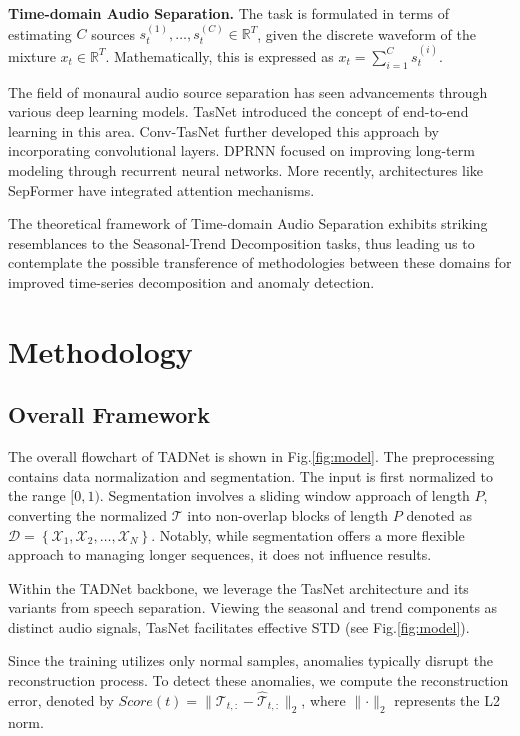 \documentclass{article}
\begin{document}
\textbf{Time-domain Audio Separation.} The task is formulated in terms of estimating \(C\) sources \(s^{(1)}_t, \ldots, s^{(C)}_t \in \mathbb{R}^T\), given the discrete waveform of the mixture \(x_t \in \mathbb{R}^T\). Mathematically, this is expressed as \(x_t = \sum\nolimits_{i=1}^{C} s^{(i)}_t\). 

The field of monaural audio source separation has seen advancements through various deep learning models. TasNet \cite{luo2018tasnet} introduced the concept of end-to-end learning in this area. Conv-TasNet \cite{luo2019conv} further developed this approach by incorporating convolutional layers. DPRNN \cite{luo2020dual} focused on improving long-term modeling through recurrent neural networks. More recently, architectures like SepFormer \cite{subakan2021attention} have integrated attention mechanisms.

The theoretical framework of Time-domain Audio Separation exhibits striking resemblances to the Seasonal-Trend Decomposition tasks, thus leading us to contemplate the possible transference of methodologies between these domains for improved time-series decomposition and anomaly detection.

\section{Methodology}
\label{sec:method}
\subsection{Overall Framework}

The overall flowchart of TADNet is shown in Fig.\ref{fig:model}. The preprocessing contains data normalization and segmentation. The input is first normalized to the range $[0, 1)$. Segmentation involves a sliding window approach of length \( P \), converting the normalized \( \mathcal{T} \) into non-overlap blocks of length $P$ denoted as \( \mathcal{D}=\left\{\mathcal{X}_1, \mathcal{X}_2, \ldots, \mathcal{X}_N\right\} \). Notably, while segmentation offers a more flexible approach to managing longer sequences, it does not influence results.

Within the TADNet backbone, we leverage the TasNet architecture and its variants \cite{luo2018tasnet, luo2019conv, luo2020dual} from speech separation. Viewing the seasonal and trend components as distinct audio signals, TasNet facilitates effective STD (see Fig.\ref{fig:model}).

Since the training utilizes only normal samples, anomalies typically disrupt the reconstruction process. To detect these anomalies, we compute the reconstruction error, denoted by \(Score(t) = \lVert \mathcal{T}_{t,:} - \hat{\mathcal{T}}_{t,:} \rVert_2\), where \(\lVert \cdot \rVert_2\) represents the L2 norm. 
\end{document}
